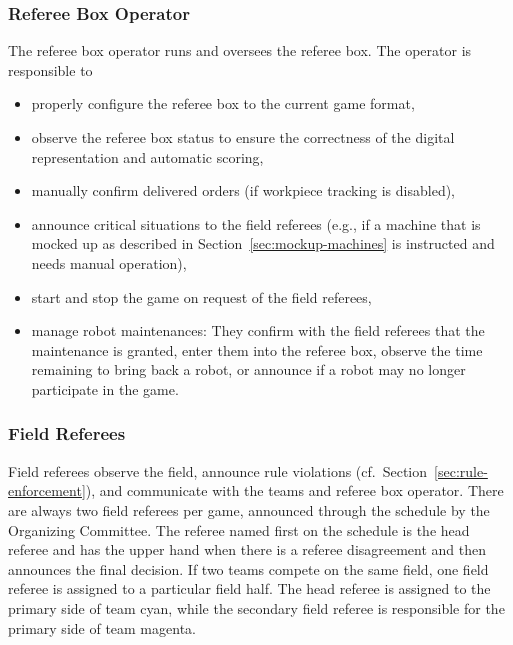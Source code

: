 \documentclass[12pt,twoside]{article}
\newcommand{\refsec}[1]{Section~\ref{#1}}
\begin{document}
\subsubsection{Referee Box Operator}
The referee box operator runs and oversees the referee box.
The operator is responsible to
\begin{itemize} \itemsep0em
  \item properly configure the referee box to the current game format,
  \item observe the referee box status to ensure the correctness of
    the digital representation and automatic scoring,
  \item manually confirm delivered orders (if workpiece tracking is disabled),
  \item announce critical situations to the field referees (e.g., if a machine
    that is mocked up as described in \refsec{sec:mockup-machines} is
    instructed and needs manual operation),
  \item start and stop the game on request of the field referees,
  \item manage robot maintenances:
    They confirm with the field referees that the maintenance is granted,
    enter them into the referee box,
    observe the time remaining to bring back a robot,
    or announce if a robot may no longer participate in the game.
\end{itemize}

\subsubsection{Field Referees}
Field referees observe the field, announce rule
violations (cf.~\refsec{sec:rule-enforcement}), and communicate with the teams
and referee box operator.
There are always two field referees per game, announced through the schedule
by the Organizing Committee.
The referee named first on the schedule is the head referee and has the upper
hand when there is a referee disagreement and then announces
the final decision.
If two teams compete on the same field, one field referee is assigned to a
particular field half.
The head referee is assigned to the primary side of team cyan, while the
secondary field referee is responsible for the primary side of team magenta.
\end{document}
